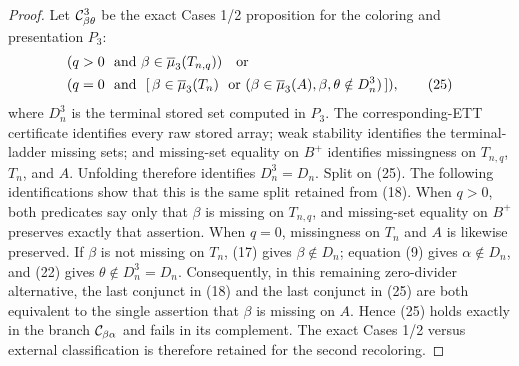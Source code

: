 \begin{proof}
Let \({\cal C}^{3}_{\beta\theta}\) be the exact Cases 1/2 proposition
for the coloring and presentation \(P_3\):
\[
 \begin{split}
 &(q>0\ \hbox{ and }
       \beta\in\overline\mu_3(T_{n,q}))\quad\hbox{or}\\
 &(q=0\ \hbox{ and }\ [\,
       \beta\in\overline\mu_3(T_n)\ \hbox{ or }
       (\beta\in\overline\mu_3(A),
        \beta,\theta\notin D_n^{3})\,]),                    \tag{25}
 \end{split}
\]
where \(D_n^{3}\) is the terminal stored set computed in \(P_3\).
The corresponding-ETT certificate identifies every raw stored array;
weak stability identifies the terminal-ladder missing sets; and
missing-set equality on \(B^+\) identifies missingness on
\(T_{n,q}\), \(T_n\), and \(A\).  Unfolding
 therefore identifies \(D_n^3=D_n\).
Split on (25).  The following identifications show that this is the
same split retained from (18).  When \(q>0\), both predicates say only
that \(\beta\) is missing on \(T_{n,q}\), and missing-set equality on
\(B^+\) preserves exactly that assertion.  When \(q=0\), missingness on
\(T_n\) and \(A\) is likewise preserved.  If \(\beta\) is not missing
on \(T_n\), (17) gives \(\beta\notin D_n\); equation (9) gives
\(\alpha\notin D_n\), and (22) gives \(\theta\notin D_n^3=D_n\).
Consequently, in this remaining zero-divider alternative, the last
conjunct in (18) and the last conjunct in (25) are both equivalent to
the single assertion that \(\beta\) is missing on \(A\).  Hence (25)
holds exactly in the branch \({\cal C}_{\beta\alpha}\) and fails in its
complement.  The exact Cases 1/2 versus external classification is
therefore retained for the second recoloring.


\end{proof}
